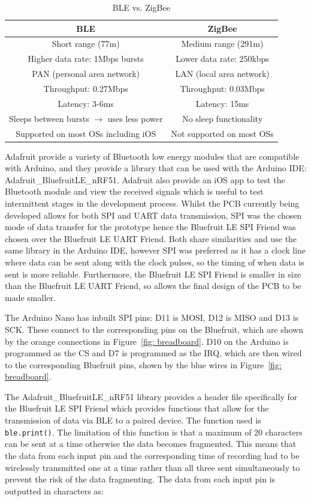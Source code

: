 \begin{table}[h!]
\centering
\begin{tabular}{||c c||} 
 \hline
 BLE & ZigBee \\ [0.5ex] 
 \hline\hline
 Short range (77m) & Medium range (291m) \\
 Higher data rate: 1Mbps bursts & Lower data rate: 250kbps \\ 
 PAN (personal area network) & LAN (local area network) \\
 Throughput: 0.27Mbps & Throughput: 0.03Mbps \\
 Latency: 3-6ms & Latency: 15ms \\
 Sleeps between bursts $\rightarrow$ uses less power & No sleep functionality \\
 Supported on most OSs including iOS & Not supported on most OSs \\
 \hline
\end{tabular}
\caption{BLE vs. ZigBee \cite{Ray2015, Christiano}}
\label{table:BLE vs ZigBee}
\end{table}

Adafruit provide a variety of Bluetooth low energy modules that are compatible with Arduino, and they provide a library that can be used with the Arduino IDE: Adafruit\_BluefruitLE\_nRF51. Adafruit also provide an iOS app to test the Bluetooth module and view the received signals which is useful to test intermittent stages in the development process. Whilst the PCB currently being developed allows for both SPI and UART data transmission, SPI was the chosen mode of data transfer for the prototype hence the Bluefruit LE SPI Friend was chosen over the Bluefruit LE UART Friend. Both share similarities and use the same library in the Arduino IDE, however SPI was preferred as it has a clock line where data can be sent along with the clock pulses, so the timing of when data is sent is more reliable. Furthermore, the Bluefruit LE SPI Friend is smaller in size than the Bluefruit LE UART Friend, so allows the final design of the PCB to be made smaller.

The Arduino Nano has inbuilt SPI pins: D11 is MOSI, D12 is MISO and D13 is SCK. These connect to the corresponding pins on the Bluefruit, which are shown by the orange connections in Figure~\ref{fig: breadboard}. D10 on the Arduino is programmed as the CS and D7 is programmed as the IRQ, which are then wired to the corresponding Bluefruit pins, shown by the blue wires in Figure~\ref{fig: breadboard}. 

The Adafruit\_BluefruitLE\_nRF51 library provides a header file specifically for the Bluefruit LE SPI Friend which provides functions that allow for the transmission of data via BLE to a paired device. The function used is {\tt{ble.print()}}. The limitation of this function is that a maximum of 20 characters can be sent at a time \cite{Townsend2018} otherwise the data becomes fragmented. This means that the data from each input pin and the corresponding time of recording had to be wirelessly transmitted one at a time rather than all three sent simultaneously to prevent the risk of the data fragmenting. The data from each input pin is outputted in characters as:

